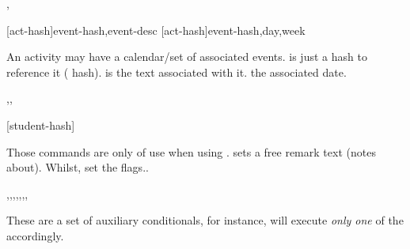 \documentclass[article,nofontwarning,nogeometry,english,tocdepth=3,secdepth=3]{ufrgscca} %
\begin{document}
\begin{codedescribe}[code,new=2023/11/18]{\ActivitySetNewEvent,\ActivitySetEventDay}
	\begin{codesyntax}%
    \tsmacro{\ActivitySetNewEvent}[act-hash]{event-hash,event-desc}
    \tsmacro{\ActivitySetEventDay}[act-hash]{event-hash,day,week}
	\end{codesyntax}
An activity may have a calendar/set of associated events.  is just a hash to reference it ( hash).  is the text associated with it.  the associated date.
\end{codedescribe}


\begin{codedescribe}[code,new=2023/11/18]{\studentremark,\studentnewpage,\distinctboard}
	\begin{codesyntax}%
		\tsmacro{\studentremark}{remarks}
		\tsmacro{\studentnewpage}[student-hash]{}
		\tsmacro{\distinctboard}{}
	\end{codesyntax}
Those commands are only of use when using . \tsmacro{\studentremark}{} sets a free remark text (notes about). Whilst, \tsobj{\distinctboard,\studentnewpage} set the  flags..
\end{codedescribe}


\begin{codedescribe}[code,new=2023/11/18,update=2023/12/02,update=2024/01/15,update=2024/02/22,update=2024/02/27]{\studentCase,\studentAdvCase,\studentCoadvCase,\studentDismissOtherCase,\studentNewPageCase,\studentDistinctBoardCase,\studentReviewerCase,\studentReviewerSetCase}
	\begin{codesyntax}%
	\end{codesyntax}
These are a set of auxiliary conditionals, for instance, \tsobj{\StudentCase} will execute \emph{only one} of the  accordingly.
\end{codedescribe}
\end{document}
